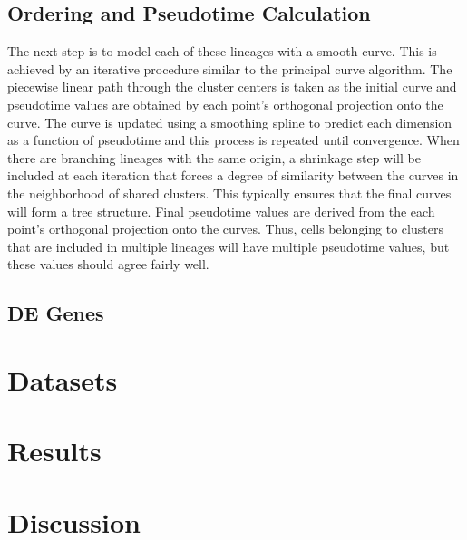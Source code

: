 \documentclass[11pt]{article}\usepackage[]{graphicx}\usepackage[]{color}
\begin{document}
\subsection{Ordering and Pseudotime Calculation}
The next step is to model each of these lineages with a smooth curve. This is achieved by an iterative procedure similar to the principal curve algorithm. The piecewise linear path through the cluster centers is taken as the initial curve and pseudotime values are obtained by each point’s orthogonal projection onto the curve. The curve is updated using a smoothing spline to predict each dimension as a function of pseudotime and this process is repeated until convergence. When there are branching lineages with the same origin, a shrinkage step will be included at each iteration that forces a degree of similarity between the curves in the neighborhood of shared clusters. This typically ensures that the final curves will form a tree structure. Final pseudotime values are derived from the each point’s orthogonal projection onto the curves. Thus, cells belonging to clusters that are included in multiple lineages will have multiple pseudotime values, but these values should agree fairly well.

\subsection{DE Genes}

\section{Datasets}

\section{Results}

\section{Discussion}
\end{document}
